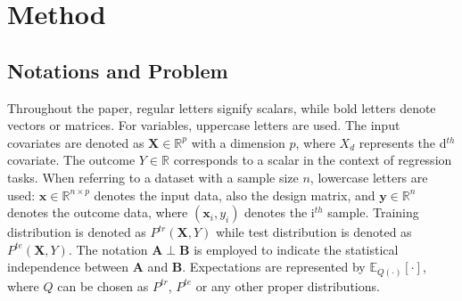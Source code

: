 \section{Method}

\subsection{Notations and Problem}
\label{sec:problem}

Throughout the paper, regular letters signify scalars, while bold letters denote vectors or matrices. 
For variables, uppercase letters are used. 
The input covariates are denoted as $\boldsymbol{X}\in \mathbb{R}^p$ with a dimension $p$, where $X_d$ represents the d$^{th}$ covariate. The outcome $Y\in \mathbb{R}$ corresponds to a scalar in the context of regression tasks. 
When referring to a dataset with a sample size $n$, lowercase letters are used: $\boldsymbol{x}\in \mathbb{R}^{n\times p}$ denotes the input data, also the design matrix, and $\boldsymbol{y}\in\mathbb{R}^n$ denotes the outcome data, where $(\boldsymbol{x}_i,y_i)$ denotes the i$^{th}$ sample. Training distribution is denoted as $P^{tr}(\boldsymbol{X}, Y)$ while test distribution is denoted as $P^{te}(\boldsymbol{X}, Y)$. 
The notation $\boldsymbol{A}\perp \boldsymbol{B}$ is employed to indicate the statistical independence between $\boldsymbol{A}$ and $\boldsymbol{B}$. 
Expectations are represented by $\mathbb{E}_{Q(\cdot)}[\cdot]$, where $Q$ can be chosen as $P^{tr}$, $P^{te}$ or any other proper distributions. 

